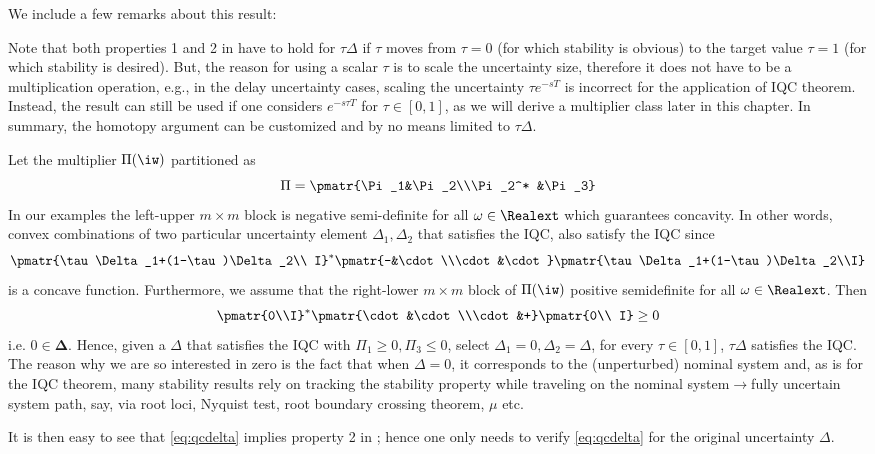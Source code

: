 We include a few remarks about this result: 
\begin{rem}\label{remiqc1}
Note that both properties 1 and 2 in  have to hold for $\tau\Delta$ 
if $\tau$ moves from $\tau=0$ (for which stability is obvious) to the target value $\tau=1$ 
(for which stability is desired). But, the reason for using a scalar $\tau$ is to scale the uncertainty
size, therefore it does not have to be a multiplication operation, e.g., in the delay uncertainty cases,
scaling the uncertainty $\tau e^{-sT}$ is incorrect for the application of IQC theorem. Instead, 
the result can still be used if one considers $e^{-s\tau T}$ for $\tau\in[0,1]$, as we will derive
a multiplier class later in this chapter. In summary, the homotopy 
argument can be customized and  by no means limited to $\tau\Delta$. 

Let the multiplier $\Pi(\iw)$ partitioned as
\begin{equation}
\Pi = \pmatr{\Pi_1&\Pi_2\\\Pi_2^* &\Pi_3}
\label{eq:Pipart}
\end{equation}
In our examples the left-upper $m\times m$ block is negative semi-definite for all $\omega\in\Realext$
which guarantees concavity. In other words, convex combinations of two particular uncertainty element 
$\Delta_1, \Delta_2$ that satisfies the IQC, also satisfy the IQC since
\[
\pmatr{\tau\Delta_1+(1-\tau)\Delta_2\\ I}^*\pmatr{-&\cdot\\\cdot &\cdot}\pmatr{\tau\Delta_1+(1-\tau)\Delta_2\\I}
\]
is a concave function. Furthermore, we assume that the right-lower $m\times m$ block of $\Pi(\iw)$ 
positive semidefinite for all $\omega\in\Realext$. Then
\[
\pmatr{0\\I}^*\pmatr{\cdot &\cdot\\\cdot &+}\pmatr{0\\ I} \geq 0
\]
i.e. $0\in\bm{\Delta}$.
Hence, given a $\Delta$ that satisfies the IQC with $\Pi_1 \geq 0, \Pi_3\leq 0$, select $\Delta_1 = 0, \Delta_2 = \Delta$, 
for every $\tau\in [0,1]$, $\tau\Delta$ satisfies the IQC. 
The reason why we are so interested in zero is the fact that when $\Delta=0$, it corresponds to the (unperturbed) nominal 
system and, as is for the IQC theorem, many stability results rely on tracking the stability property while traveling on 
the nominal system$\to$fully uncertain system path, say, via root loci, Nyquist test, root boundary crossing theorem, $\mu$ 
etc. 


It is then easy to see that \eqref{eq:qcdelta} implies property 2 in ; 
hence one only needs to verify \eqref{eq:qcdelta} for the original uncertainty $\Delta$.
\end{rem}

